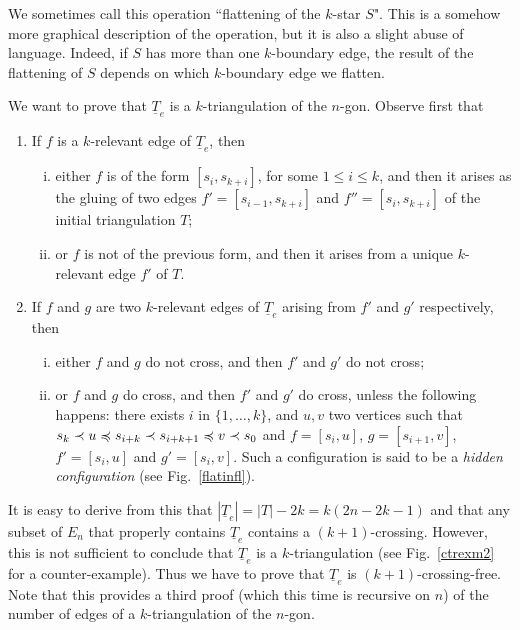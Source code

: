 \documentclass[12pt]{amsart}
\begin{document}
\begin{remark}
\rm
We sometimes call this operation ``flattening of the $k$-star $S$". This is a somehow more graphical description of the operation, but it is also a slight abuse of language. Indeed, if $S$ has more than one $k$-boundary edge, the result of the flattening of $S$ depends on which $k$-boundary edge we flatten.
\end{remark}

We want to prove that $\underline{T}_e$ is a $k$-triangulation of the $n$-gon. Observe first that
\begin{enumerate}
\item If $f$ is a $k$-relevant edge of $\underline{T}_e$, then
\begin{enumerate}[(i)]
\item either $f$ is of the form $[s_i,s_{k+i}]$, for some $1\le i\le k$, and then it arises as the gluing of two edges $f'=[s_{i-1},s_{k+i}]$ and $f''=[s_i,s_{k+i}]$ of the initial triangulation $T$;
\item or $f$ is not of the previous form, and then it arises from a unique $k$-relevant edge $f'$ of $T$.
\end{enumerate}

\item If $f$ and $g$ are two $k$-relevant edges of $\underline{T}_e$ arising from $f'$ and $g'$ respectively, then
\begin{enumerate}[(i)]
\item either $f$ and $g$ do not cross, and then $f'$ and $g'$ do not cross; 
\item or $f$ and $g$ do cross, and then $f'$ and $g'$ do cross, unless the following happens: there exists $i$ in $\{1,\ldots,k\}$, and $u,v$ two vertices such that $s_k\prec u\preccurlyeq s_{i+k}\prec s_{i+k+1}\preccurlyeq v\prec s_0$ and $f=[s_i,u]$, $g=[s_{i+1},v]$, $f'=[s_i,u]$ and $g'=[s_i,v]$. Such a configuration is said to be a \emph{hidden configuration} (see Fig.~\ref{flatinfl}).
\end{enumerate}
\end{enumerate}

It is easy to derive from this that $|\underline{T}_e|=|T|-2k=k(2n-2k-1)$ and that any subset of $E_n$ that properly contains $\underline{T}_e$ contains a $(k+1)$-crossing. However, this is not sufficient to conclude that $\underline{T}_e$ is a $k$-triangulation (see Fig.~\ref{ctrexm2} for a counter-example). Thus we have to prove that $\underline{T}_e$ is $(k+1)$-crossing-free. Note that this provides a third proof (which this time is recursive on $n$) of the number of edges of a $k$-triangulation of the $n$-gon.
\end{document}
